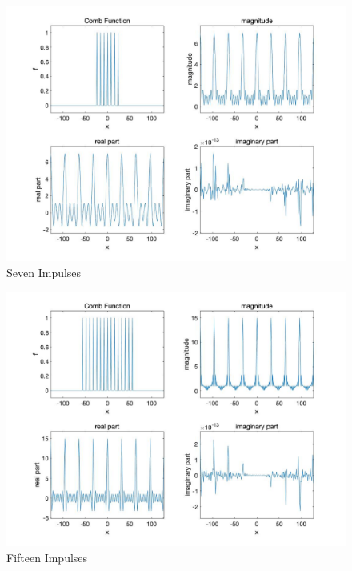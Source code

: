 \documentclass[11pt,a4paper,BCOR12mm, headexclude, footexclude, twoside, openright]{scrartcl}
\numberwithin{equation}{section} %
\numberwithin{figure}{section} %
\numberwithin{table}{section} %
\begin{document}
\newpage

\begin{figure}[h!]
\centering
\includegraphics[scale=0.35]{2.jpg}
\caption{Seven Impulses}
\end{figure}

\newpage

\begin{figure}[h!]
\centering
\includegraphics[scale=0.35]{8.jpg}
\caption{Fifteen Impulses}
\end{figure}

\newpage
\end{document}
